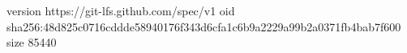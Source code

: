 version https://git-lfs.github.com/spec/v1
oid sha256:48d825c0716cddde58940176f343d6cfa1c6b9a2229a99b2a0371fb4bab7f600
size 85440
